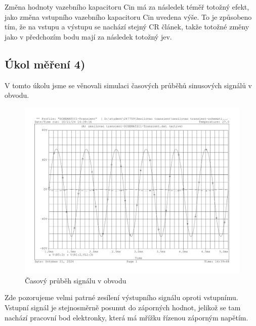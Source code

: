 \documentclass[a4paper, czech]{article}
\begin{document}
Změna hodnoty vazebního kapacitoru Cin má za následek téměř totožný efekt, jako změna vstupního vazebního kapacitoru Cin uvedena výše.
To je způsobeno tím, že na vstupu a výstupu se nachází stejný CR článek, takže totožné změny jako v předchozím bodu mají za následek totožný jev.

\pagebreak

\subsection{Úkol měření 4)}

V tomto úkolu jsme se věnovali simulaci časových průběhů sinusových signálů v obvodu.

\begin{figure}[H]
    \centering
    \includegraphics[width=\textwidth]{charakteristiky/uloha4.pdf}
    \caption{Časový průběh signálu v obvodu}
\end{figure}

Zde pozorujeme velmi patrné zesílení výstupního signálu oproti vstupnímu.
Vstupní signál je stejnosměrně posunut do záporných hodnot, jelikož se tam nachází pracovní bod elektronky, která má mřížku řízenou záporným napětím.
\end{document}
